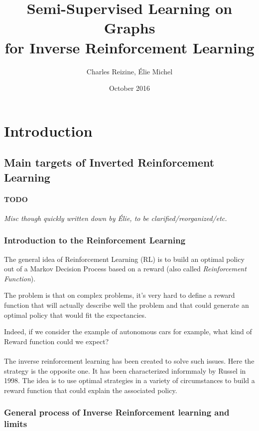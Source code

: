 \documentclass{article}
\title{Semi-Supervised Learning on Graphs \\
for Inverse Reinforcement Learning}
\author{Charles Reizine, Élie Michel}
\date{October 2016}
\begin{document}
\maketitle

\section{Introduction}

\subsection{Main targets of Inverted Reinforcement Learning}

\paragraph{TODO}
\emph{Misc though quickly written down by Élie, to be clarified/reorganized/etc.}


\subsubsection{Introduction to the Reinforcement Learning}
The general idea of Reinforcement Learning (RL) is to build an optimal policy out of a Markov Decision Process based on a reward (also called \emph{Reinforcement Function}).

The problem is that on complex problems, it's very hard to define a reward function that will actually describe well the problem and that could generate an optimal policy that would fit the expectancies.

Indeed, if we consider the example of autonomous cars for example, what kind of Reward function could we expect?

\paragraph{}
The inverse reinforcement learning has been created to solve such issues. Here the strategy is the opposite one. It has been characterized informmaly by Russel in 1998. The idea is to use optimal strategies in a variety of circumstances to build a reward function that could explain the associated policy.

\subsubsection{General process of Inverse Reinforcement learning and limits}
\end{document}
